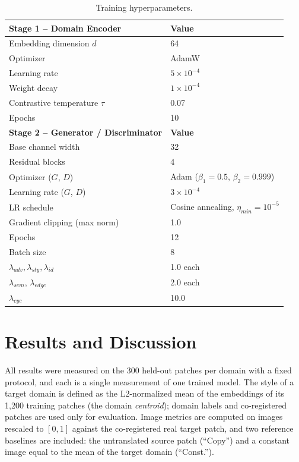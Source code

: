 \documentclass[runningheads]{llncs}
\begin{document}
\begin{table}[t]
\centering
\caption{Training hyperparameters.}
\label{tab:hyperparams}
\begin{tabular}{@{}ll@{}}
\toprule
\textbf{Stage 1 -- Domain Encoder} & \textbf{Value} \\
\midrule
Embedding dimension $d$            & 64 \\
Optimizer                          & AdamW \\
Learning rate                      & $5\times10^{-4}$ \\
Weight decay                       & $1\times10^{-4}$ \\
Contrastive temperature $\tau$     & 0.07 \\
Epochs                             & 10 \\
\midrule
\textbf{Stage 2 -- Generator / Discriminator} & \textbf{Value} \\
\midrule
Base channel width                 & 32 \\
Residual blocks                    & 4 \\
Optimizer ($G$, $D$)               & Adam ($\beta_1{=}0.5$, $\beta_2{=}0.999$) \\
Learning rate ($G$, $D$)           & $3\times10^{-4}$ \\
LR schedule                        & Cosine annealing, $\eta_{min}{=}10^{-5}$ \\
Gradient clipping (max norm)       & 1.0 \\
Epochs                             & 12 \\
Batch size                         & 8 \\
$\lambda_{adv},\lambda_{sty},\lambda_{id}$ & 1.0 each \\
$\lambda_{sem}$, $\lambda_{edge}$  & 2.0 each \\
$\lambda_{cyc}$                    & 10.0 \\
\bottomrule
\end{tabular}
\end{table}

\section{Results and Discussion}
\label{sec:results}
All results were measured on the 300 held-out patches per domain with a fixed protocol, and each is a single measurement of one trained model. The style of a target domain is defined as the L2-normalized mean of the embeddings of its 1{,}200 training patches (the domain \emph{centroid}); domain labels and co-registered patches are used only for evaluation. Image metrics are computed on images rescaled to $[0,1]$ against the co-registered real target patch, and two reference baselines are included: the untranslated source patch (``Copy'') and a constant image equal to the mean of the target domain (``Const.'').
\end{document}

